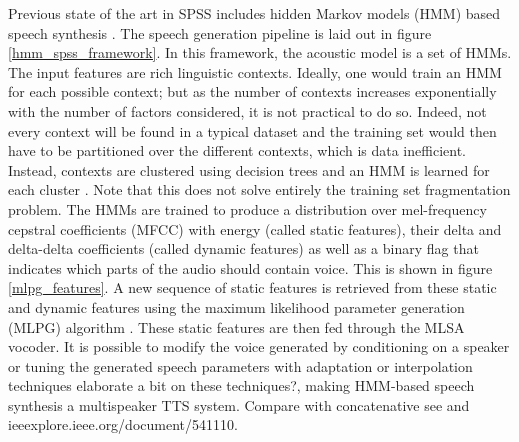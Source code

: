 \documentclass[a4paper, oneside, 12pt, english]{article}
\begin{document}
Previous state of the art in SPSS includes hidden Markov models (HMM) based speech synthesis \citep{Tokuda-2013}. The speech generation pipeline is laid out in figure \ref{hmm_spss_framework}. In this framework, the acoustic model is a set of HMMs. The input features are rich linguistic contexts. Ideally, one would train an HMM for each possible context; but as the number of contexts increases exponentially with the number of factors considered, it is not practical to do so. Indeed, not every context will be found in a typical dataset and the training set would then have to be partitioned over the different contexts, which is data inefficient. Instead, contexts are clustered using decision trees and an HMM is learned for each cluster \citep{HMMTTS}. Note that this does not solve entirely the training set fragmentation problem. The HMMs are trained to produce a distribution over mel-frequency cepstral coefficients (MFCC) with energy (called static features), their delta and delta-delta coefficients (called dynamic features) as well as a binary flag that indicates which parts of the audio should contain voice. This is shown in figure \ref{mlpg_features}. A new sequence of static features is retrieved from these static and dynamic features using the maximum likelihood parameter generation (MLPG) algorithm \citep{Tokuda-2000}. These static features are then fed through the MLSA vocoder\citep{MLSA}. It is possible to modify the voice generated by conditioning on a speaker or tuning the generated speech parameters with adaptation or interpolation techniques \citep{HMMSpeakerInterpolation} \color{red} elaborate a bit on these techniques?\color{black}, making HMM-based speech synthesis a multispeaker TTS system. \color{red} Compare with concatenative see \citep{SPSSDNN} and ieeexplore.ieee.org/document/541110.\color{black}
\end{document}
